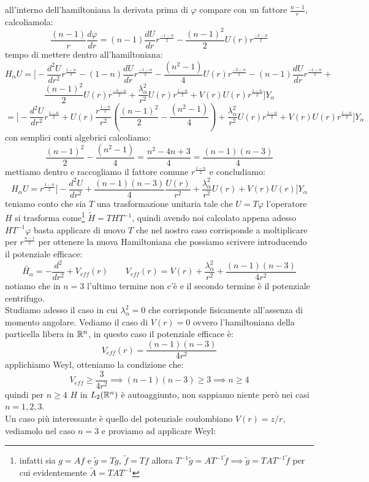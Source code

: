 all'interno dell'hamiltoniana la derivata prima di $\varphi$ compare con un fattore $\frac{n-1}{r}$, calcoliamola:
\[\frac{(n-1)}{r}\frac{d\varphi}{dr} = (n-1)\frac{dU}{dr}r^{\frac{-1-n}{2}} -\frac{(n-1)^2}{2}U(r)r^{\frac{-3-n}{2}}\]
tempo di mettere dentro all'hamiltoniana:
\[H_\alpha U = \Big[-\frac{d^2U}{dr^2}r^{\frac{1-n}{2}} - (1-n)\frac{dU}{dr}r^{\frac{-1-n}{2}} - \frac{(n^2-1)}{4}U(r)r^{\frac{-3-n}{2}} - (n-1)\frac{dU}{dr}r^{\frac{-1-n}{2}} +\]\[\frac{(n-1)^2}{2}U(r)r^{\frac{-3-n}{2}} + \frac{\lambda_\alpha^2}{r^2}U(r)r^{\frac{1-n}{2}}+V(r)U(r)r^{\frac{1-n}{2}}  \Big]Y_\alpha  \]
\[ =\Big[-\frac{d^2U}{dr^2}r^{\frac{1-n}{2}} + U(r)\frac{r^{\frac{1-n}{2}}}{r^2}\left(\frac{(n-1)^2}{2}- \frac{(n^2-1)}{4}\right) + \frac{\lambda_\alpha^2}{r^2}U(r)r^{\frac{1-n}{2}}+V(r)U(r)r^{\frac{1-n}{2}}  \Big]Y_\alpha \]
con semplici conti algebrici calcoliamo:
\[\frac{(n-1)^2}{2}- \frac{(n^2-1)}{4} = \frac{n^2-4n+3}{4} = \frac{(n-1)(n-3)}{4} \]
mettiamo dentro e raccogliamo il fattore comune $r^{\frac{1-n}{2}}$ e concludiamo:
\[H_\alpha U = r^{\frac{1-n}{2}}\Big[-\frac{d^2U}{dr^2} + \frac{(n-1)(n-3)}{4} \frac{U(r)}{r^2}+ \frac{\lambda_\alpha^2}{r^2}U(r)+V(r)U(r)\Big]Y_\alpha\]
teniamo conto che sia $T$ una trasformazione unitaria tale che $U=T\varphi$ l'operatore $H$ si trasforma come\footnote{infatti sia $g=Af$ e $\tilde{g} = Tg$, $\tilde{f} = Tf$ allora $T^{-1}\tilde{g} = AT^{-1}\tilde{f} \implies \tilde{g} = TAT^{-1}\tilde{f}$ per cui evidentemente $\tilde{A} = TAT^{-1}$} $\widetilde{H} = THT^{-1}$, quindi avendo noi calcolato appena adesso $HT^{-1}\varphi$ basta applicare di nuovo $T$ che nel nostro caso corrisponde a moltiplicare per $r^{\frac{n-1}{2}}$ per ottenere la nuova Hamiltoniana che possiamo scrivere introducendo il potenziale efficace:
\[\widetilde{H_\alpha} =-\frac{d^2}{dr^2} + V_{eff}(r)\qquad V_{eff}(r) = V(r) + \frac{\lambda_\alpha^2}{r^2} + \frac{(n-1)(n-3)}{4r^2} \]
notiamo che in $n=3$ l'ultimo termine non c'è e il secondo termine è il potenziale centrifugo.\\ Studiamo adesso il caso in cui $\lambda_\alpha^2 = 0$ che corrisponde fisicamente all'assenza di momento angolare. Vediamo il caso di $V(r)=0$ ovvero l'hamiltoniana della particella libera in $\mathbb{R}^n$, in questo caso il potenziale efficace è:
\[V_{eff}(r) = \frac{(n-1)(n-3)}{4r^2}\]
applichiamo Weyl, otteniamo la condizione che:
\[V_{eff}\geq \frac{3}{4r^2} \implies (n-1)(n-3) \geq 3 \implies n\geq 4 \]
quindi per $n\geq4$ $H$ in $L_2(\mathbb{R}^n)$ è autoaggiunto, non sappiamo niente però nei casi $n=1,2,3$.\\
Un caso più interessante è quello del potenziale coulombiano $V(r) = z/r$, vediamolo nel caso $n=3$ e proviamo ad applicare Weyl:
